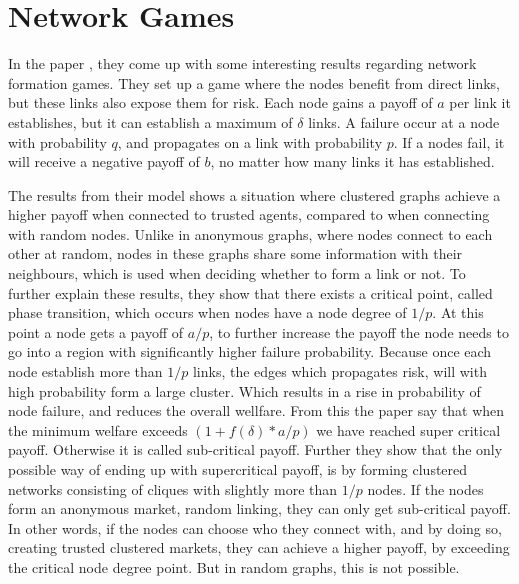 \chapter{Network Games}
\label{chp:networkgames} 

In the paper \cite{contagion}, they come up with some interesting results regarding network formation games. 
They set up a game where the nodes benefit from direct links, but these links also expose them for risk. 
Each node gains a payoff of  $a$ per link it establishes, but it can establish a maximum of $\delta$ links.
A failure occur at a node with probability $q$, and propagates on a link with probability $p$. If a nodes fail, it will receive a negative payoff of $b$, no matter how many links it has established.

The results from their model shows a situation where clustered graphs achieve a higher payoff when connected to trusted agents, compared to when connecting with random nodes. Unlike in anonymous graphs, where nodes connect to each other at random, nodes in these graphs share some information with their neighbours, which is used when deciding whether to form a link or not. 
To further explain these results, they show that there exists a critical point, called phase transition, which occurs when nodes have a node degree of $1/p$. 
At this point a node gets a payoff of $a/p$, to further increase the payoff the node needs to go into a region with significantly higher failure probability. 
Because once each node establish more than $1/p$ links, the edges which propagates risk, will with high probability form a large cluster. Which results in a rise in probability of node failure, and reduces the overall wellfare.
From this the paper say that when the minimum welfare exceeds 
$(1+f(\delta)*a/p)
$
we have reached super critical payoff. Otherwise it is called sub-critical payoff. 
Further they show that the only possible way of ending up with supercritical payoff, is by forming clustered networks consisting of cliques with slightly more than $1/p$ nodes. 
If the nodes form an anonymous market, random linking, they can only get sub-critical payoff. 
In other words, if the nodes can choose who they connect with, and by doing so, creating trusted clustered markets, they can achieve a higher payoff, by exceeding the critical node degree point. But in random graphs, this is not possible.  

